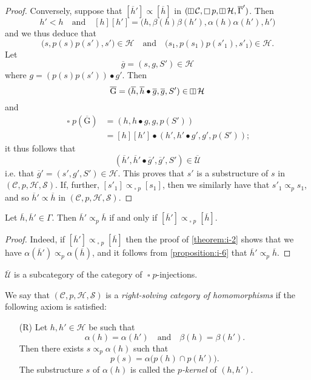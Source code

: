\documentclass[a4paper,fleqn]{article}
\theoremstyle{plain}
\newenvironment{corollary}[1]
  {\renewcommand\theinnercorollary{#1}\innercorollary}
  {\endinnercorollary}
\theoremstyle{definition}
\newenvironment{definition}[1]
  {\renewcommand\theinnerdefinition{#1}\innerdefinition}
  {\endinnerdefinition}
\newcommand{\oldpage}[1]{{\marginpar{\footnotesize$\bigg\vert$\,\,\,\,\textit{p.~#1}}}}
\newcommand{\textand}{\quad\text{and}\quad}
\newcommand{\CC}{\mathcal{C}}
\newcommand{\HH}{\mathcal{H}}
\renewcommand{\SS}{\mathcal{S}}
\newcommand{\UU}{\mathcal{U}}
\newcommand{\subs}{\mathrel{\propto}}
\newcommand{\vsqbox}{{\rotatebox{90}{$\boxminus$}}}
\DeclareMathOperator{\sq}{\square}
\DeclareMathOperator{\vsq}{\raisebox{-.1em}{$\vsqbox$}}
\begin{document}
\begin{proof}
  Conversely, suppose that $[\overline{h}']\subs[\overline{h}]$ in $(\vsq\CC,\sq p,\vsq\HH,\overline{\Gamma}')$.
  Then
  \[
    h'<h
    \textand
    [h][h'] = \big(
      h, \beta(h)\beta(h'), \alpha(h)\alpha(h'), h'
    \big)
  \]
  \oldpage{369}
  and we thus deduce that
  \[
    \big( s, p(s)p(s'), s' \big)\in\HH
    \textand
    \big( s_1, p(s_1)p(s'_1), s'_1 \big)\in\HH.
  \]
  Let
  \[
    \overline{g}
    = (s,g,S')\in\HH
  \]
  where $g=(p(s)p(s'))\bullet g'$.
  Then
  \[
    \overline{\mathrm{G}}
    = (\overline{h},\overline{h}\bullet\overline{g},\overline{g},S')
    \in\vsq\HH
  \]
  and
  \[
    \begin{aligned}
      \sq p(\overline{\mathrm{G}})
      &= (h,h\bullet g,g,p(S'))
    \\&= [h][h']\bullet(h',h'\bullet g',g',p(S'));
    \end{aligned}
  \]
  it thus follows that
  \[
    (\overline{h}',\overline{h}'\bullet\overline{g}',\overline{g}',S')\in\overline{\UU}
  \]
  i.e. that $\overline{g}'=(s',g',S')\in\HH$.
  This proves that $s'$ is a substructure of $s$ in $(\CC,p,\HH,\SS)$.
  If, further, $[s'_1]\subs_{\sq p}[s_1]$, then we similarly have that $s'_1\subs_p s_1$, and so $\overline{h}'\subs\overline{h}$ in $(\CC,p,\HH,\SS)$.
\end{proof}

\begin{corollary}{1}
  Let $\overline{h},\overline{h}'\in\Gamma$.
  Then $\overline{h}'\subs_p\overline{h}$ if and only if $[\overline{h}']\subs_{\sq p}[\overline{h}]$.
\end{corollary}

\begin{proof}
  Indeed, if $[\overline{h}']\subs_{\sq p}[\overline{h}]$ then the proof of \cref{theorem:i-2} shows that we have $\alpha(\overline{h}')\subs_p\alpha(\overline{h})$, and it follows from \cref{proposition:i-6} that $\overline{h}'\subs_p\overline{h}$.
\end{proof}

\begin{corollary}{2}
  $\overline{\UU}$ is a subcategory of the category of $\sq p$-injections.
\end{corollary}

\begin{definition}{9}
\label{definition:i-9}
  We say that $(\CC,p,\HH,\SS)$ is a \emph{right-solving category of homomorphisms} if the following axiom is satisfied:
  \begin{enumerate}
    \item[\normalfont(R)] Let $h,h'\in\HH$ be such that
      \[
        \alpha(h)=\alpha(h')
        \textand
        \beta(h)=\beta(h').
      \]
      Then there exists $s\subs_p\alpha(h)$ such that
      \[
        p(s)
        = \alpha\big(
          p(h)\cap p(h')
        \big).
      \]
      The substructure $s$ of $\alpha(h)$ is called the \emph{$p$-kernel} of $(h,h')$.
  \end{enumerate}
\end{definition}
\end{document}
